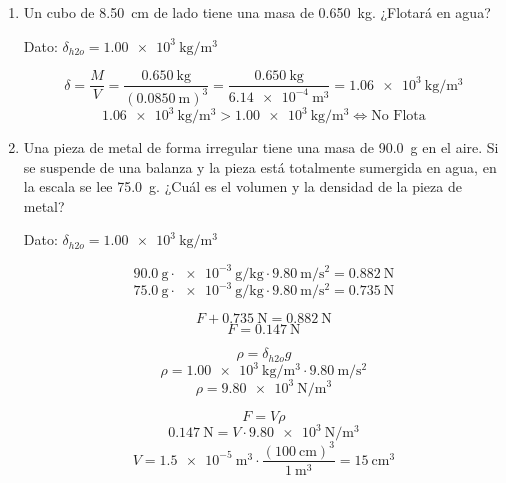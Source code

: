 \documentclass[../practica.root.tex]{subfiles}
\begin{document}
\begin{enumerate}
	\item Un cubo de \SI{8,50}{\cm} de lado tiene una masa de \SI{0,650}{\kilogram}. ¿Flotará en agua?

	      Dato: $\delta_{h2o}=\SI{1,00e3}{\kilogram\per\meter\cubed}$

	      \[
		      \delta=\frac{M}{V}
		      =\frac{\SI{0,650}{\kilogram}}{(\SI{0,0850}{\meter})^3}
		      =\frac{\SI{0,650}{\kilogram}}{\SI{6,14e-4}{\meter\cubed}}
		      =\SI{1,06e3}{\kilogram\per\meter\cubed}
	      \]
	      \[\SI{1,06e3}{\kilogram\per\meter\cubed}>\SI{1,00e3}{\kilogram\per\meter\cubed}\iff\text{No Flota}\]

	      \newpage

	\item Una pieza de metal de forma irregular tiene una masa de \SI{90,0}{\gram} en el aire. Si se suspende de una balanza y la pieza está totalmente sumergida en agua, en la escala se lee \SI{75,0}{\gram}. ¿Cuál es el volumen y la densidad de la pieza de metal?

	      Dato: $\delta_{h2o}=\SI{1,00e3}{\kilogram\per\meter\cubed}$

	      \begin{multicols}{2}
		      \begin{center}
		      \end{center}

		      \[\SI{90,0}{\gram}\cdot\SI{e-3}{\gram\per\kilogram}\cdot\SI{9,80}{\meter\per\second\squared}=\SI{0,882}{\newton}\]
		      \[\SI{75,0}{\gram}\cdot\SI{e-3}{\gram\per\kilogram}\cdot\SI{9,80}{\meter\per\second\squared}=\SI{0,735}{\newton}\]

		      \[F+\SI{0,735}{\newton}=\SI{0,882}{\newton}\]
		      \[F=\SI{0,147}{\newton}\]

		      \[\rho=\delta_{h2o}g\]
		      \[\rho=\SI{1,00e3}{\kilogram\per\meter\cubed}\cdot\SI{9,80}{\meter\per\second\squared}\]
		      \[\rho=\SI{9,80e3}{\newton\per\meter\cubed}\]

		      \[F=V\rho\]
		      \[\SI{0,147}{\newton}=V\cdot\SI{9,80e3}{\newton\per\meter\cubed}\]
		      \[V=\SI{1,5e-5}{\meter\cubed}\cdot\frac{(\SI{100}{\cm})^3}{\SI{1}{\meter\cubed}}=\SI{15}{\cm\cubed}\]


\end{multicols}
\end{enumerate}
\end{document}
